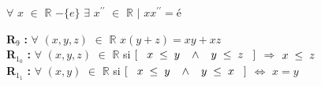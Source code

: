 \documentclass[12pt]{article}
\begin{document}
\begin{center}
    $\forall$ $x$ $\in$ $\mathbb{R}$ $-\{e\}$ \hspace{0.3cm} $\exists$ $x^{{\prime}{\prime}}$ $\in$ $\mathbb{R}$ $\mid$ $xx^{{\prime}{\prime}} = é$
\end{center}

\textbf{R}$_9$ \hspace{0.1cm}\textbf{:} $\forall$ $ ( x , y, z) $ $\in$ $\mathbb{R}$ \hspace{0.1 cm} $x (y+z) = xy+xz$ \\

\textbf{R}$_1_0$ \hspace{0.1cm}\textbf{:} $\forall$ $ ( x , y, z) $ $\in$ $\mathbb{R}$ \hspace{0.1 cm} si \hspace{0.1 cm} $\left[ \hspace{0.3 cm} x\hspace{0.1 cm}\leq \hspace{0.1 cm} y \hspace{0.3 cm} \wedge \hspace{0.3
cm} y\hspace{0.1 cm} \leq \hspace{0.1 cm} z \hspace{0.3 cm} \right]$ \hspace{0.1 cm} $\Rightarrow$ \hspace{0.3cm} $ x \hspace{0.1 cm}\leq \hspace{0.1 cm} z $ \\

\textbf{R}$_1_1$ \hspace{0.1cm}\textbf{:} $\forall$ $ ( x , y) $ $\in$ $\mathbb{R}$ \hspace{0.1 cm} si \hspace{0.1 cm} $\left[ \hspace{0.3 cm} x\hspace{0.1 cm}\leq \hspace{0.1 cm} y \hspace{0.3 cm} \wedge \hspace{0.3
cm} y\hspace{0.1 cm} \leq \hspace{0.1 cm} x \hspace{0.3 cm} \right]$ \hspace{0.1 cm} $\Leftrightarrow$ \hspace{0.3cm} $ x = y $ \\
\end{document}
